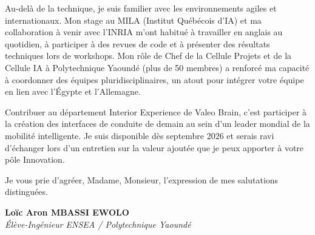 \documentclass[a4paper,11pt]{article}
\begin{document}
Au-delà de la technique, je suis familier avec les environnements agiles et internationaux. Mon stage au MILA (Institut Québécois d'IA) et ma collaboration à venir avec l'INRIA m'ont habitué à travailler en anglais au quotidien, à participer à des revues de code et à présenter des résultats techniques lors de workshops. Mon rôle de Chef de la Cellule Projets et de la Cellule IA à Polytechnique Yaoundé (plus de 50 membres) a renforcé ma capacité à coordonner des équipes pluridisciplinaires, un atout pour intégrer votre équipe en lien avec l'Égypte et l'Allemagne.

Contribuer au département Interior Experience de Valeo Brain, c'est participer à la création des interfaces de conduite de demain au sein d'un leader mondial de la mobilité intelligente. Je suis disponible dès septembre 2026 et serais ravi d'échanger lors d'un entretien sur la valeur ajoutée que je peux apporter à votre pôle Innovation.

Je vous prie d'agréer, Madame, Monsieur, l'expression de mes salutations distinguées.

\vspace{0.8cm}

\textbf{Loïc Aron MBASSI EWOLO}\\
\textit{Élève-Ingénieur ENSEA / Polytechnique Yaoundé}
\end{document}
